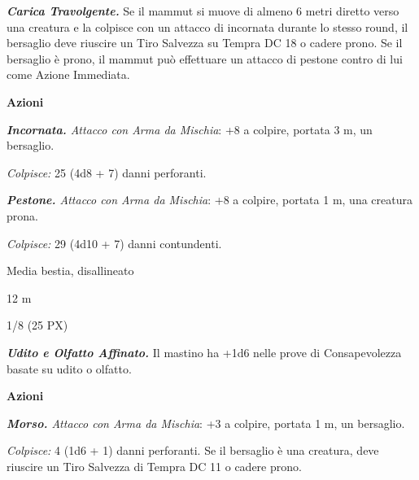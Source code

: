 \begin{multicols}{2}
{\emph{\textbf{Carica Travolgente.}} Se il mammut si muove di almeno 6 metri diretto verso una creatura e la colpisce con un attacco di incornata durante lo stesso round, il bersaglio deve riuscire un Tiro Salvezza su Tempra DC 18 o cadere prono. Se il bersaglio è prono, il mammut può effettuare un attacco di pestone contro di lui come Azione Immediata.

\textbf{Azioni}

\emph{\textbf{Incornata.} Attacco con Arma da Mischia}: +8 a colpire, portata 3 m, un bersaglio.

\emph{Colpisce:} 25 (4d8 + 7) danni perforanti.

\emph{\textbf{Pestone.} Attacco con Arma da Mischia}: +8 a colpire, portata 1 m, una creatura prona.

\emph{Colpisce:} 29 (4d10 + 7) danni contundenti.

\begin{description}[noitemsep, topsep=0pt, parsep=0pt, partopsep=0pt, itemsep=1pt, leftmargin=2.35cm,  labelwidth=2.2cm, itemindent=0cm, listparindent=0pt] %
\setlength{\baselineskip}{10pt}
\item[\textbf{Taglia/Tipo}] Media bestia, disallineato
\item[\textbf{Caratt.}] 
\item[\textbf{Punti Ferita}] 
\item[\textbf{Tiri Salvez.}] 
\item[\textbf{Movimento}] 12 m
\item[\textbf{Sfida}] 1/8 (25 PX)
\end{description}
\smallskip

\emph{\textbf{Udito e Olfatto Affinato.}} Il mastino ha +1d6 nelle prove di Consapevolezza basate su udito o olfatto.

\textbf{Azioni}

\emph{\textbf{Morso.} Attacco con Arma da Mischia}: +3 a colpire, portata 1 m, un bersaglio.

\emph{Colpisce:} 4 (1d6 + 1) danni perforanti. Se il bersaglio è una creatura, deve riuscire un Tiro Salvezza di Tempra DC 11 o cadere prono.

}
\end{multicols}
